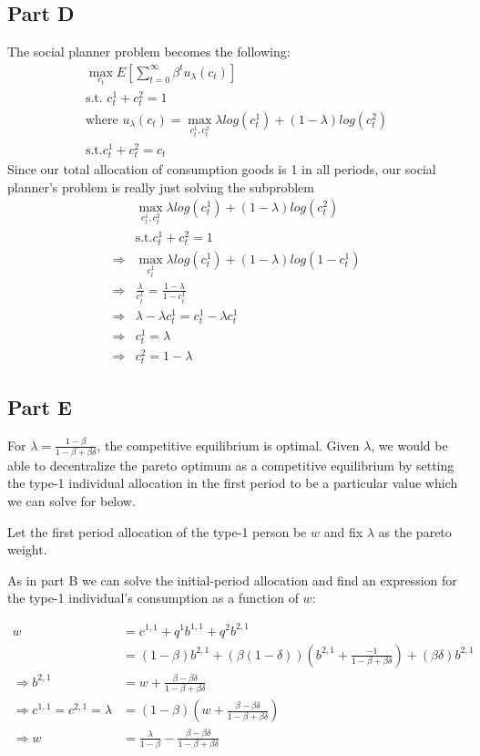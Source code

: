 \documentclass[11pt]{article} %
\begin{document}
\subsection{Part D}
The social planner problem becomes the following:
\begin{align*}
\max_{c_t}E\left[ \sum_{t=0}^{\infty} \beta^t u_{\lambda}(c_t) \right]\\
\text{s.t. } c^{1}_t + c^{2}_t = 1 \\
\text{where } u_{\lambda}(c_t) = \max_{c_t^1,c_t^2} \lambda log(c_t^1) + (1-\lambda)log(c_t^2)\\
\text{s.t.} c_t^1+ c_t^2 = c_t
\end{align*}
Since our total allocation of consumption goods is 1 in all periods, our social planner's problem is really just solving the subproblem
\begin{align*}
&\max_{c_t^1,c_t^2} \lambda log(c_t^1) + (1-\lambda)log(c_t^2) \\
&\text{s.t.} c_t^1+ c_t^2 = 1\\
\Rightarrow  &\max_{c_t^1} \lambda log(c_t^1) + (1-\lambda)log(1-c_t^1) \\
\Rightarrow &\frac{\lambda}{c_t^1} = \frac{1-\lambda}{1-c_t^1} \\
\Rightarrow &\lambda - \lambda c_t^1 = c_t^1 - \lambda c_t^1\\
\Rightarrow &c_t^1 = \lambda\\
\Rightarrow &c_t^2 = 1-\lambda
\end{align*}
\subsection{Part E}
For $\lambda = \frac{1-\beta}{1-\beta + \beta\delta}$, the competitive equilibrium is optimal. Given $\lambda$, we would be able to decentralize the pareto optimum as a competitive equilibrium by setting the type-1 individual allocation in the first period to be a particular value which we can solve for below.

Let the first period allocation of the type-1 person be $w$ and fix $\lambda$ as the pareto weight.

As in part B we can solve the initial-period allocation and find an expression for the type-1 individual's consumption as a function of $w$:

\begin{align*}
w &= c^{1,1} + q^1b^{1,1} + q^2b^{2,1}\\
 &= (1-\beta)b^{2,1} + ( \beta(1-\delta))\left( b^{2,1}+\frac{-1}{1-\beta + \beta \delta}\right) + (\beta\delta)b^{2,1}\\
\Rightarrow  b^{2,1} &= w + \frac{\beta - \beta\delta}{1-\beta + \beta\delta}\\
 \Rightarrow c^{1,1} = c^{2,1} = \lambda &= (1-\beta)\left( w + \frac{\beta - \beta\delta}{1-\beta + \beta\delta}\right)\\
\Rightarrow w &= \frac{\lambda}{1-\beta} -  \frac{\beta - \beta\delta}{1-\beta + \beta\delta}
\end{align*}
\end{document}
